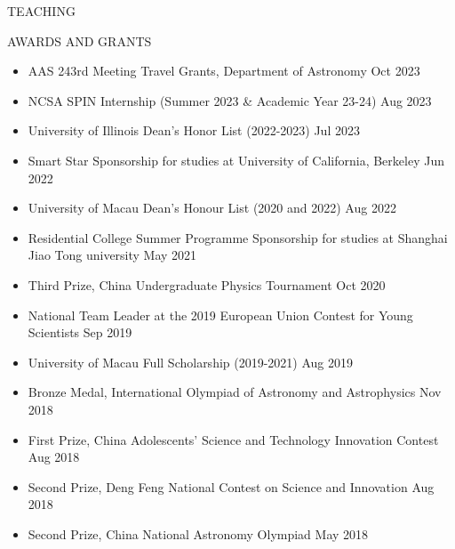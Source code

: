 \documentclass[10pt]{article} %
\begin{document}
\begin{section}{TEACHING}
\end{section}

\newpage

\begin{section}{AWARDS AND GRANTS}

    \begin{itemize}[leftmargin=1.5em]
        \item AAS 243rd Meeting Travel Grants, Department of Astronomy \hfill Oct 2023
        \item NCSA SPIN Internship (Summer 2023 \& Academic Year 23-24) \hfill Aug 2023 
        \item University of Illinois Dean's Honor List (2022-2023) \hfill Jul 2023
        \item Smart Star Sponsorship for studies at University of California, Berkeley \hfill Jun 2022
        \item University of Macau Dean's Honour List (2020 and 2022) \hfill Aug 2022
        \item Residential College Summer Programme Sponsorship for studies at Shanghai Jiao Tong university \hfill May 2021
        \item Third Prize, China Undergraduate Physics Tournament \hfill Oct 2020
        \item National Team Leader at the 2019 European Union Contest for Young Scientists \hfill Sep 2019
        \item University of Macau Full Scholarship (2019-2021) \hfill Aug 2019
        \item Bronze Medal, International Olympiad of Astronomy and Astrophysics \hfill Nov 2018
        \item First Prize, China Adolescents' Science and Technology Innovation Contest \hfill Aug 2018
        \item Second Prize, Deng Feng National Contest on Science and Innovation \hfill Aug 2018
        \item Second Prize, China National Astronomy Olympiad \hfill May 2018
    \end{itemize}
        
    \end{section}
\end{document}
